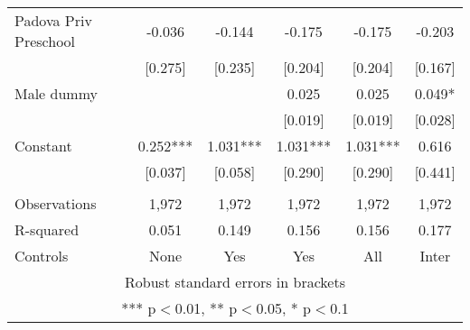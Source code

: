 \begin{tabular}{lccccc}
Padova Priv Preschool & -0.036 & -0.144 & -0.175 & -0.175 & -0.203 \\
 & [0.275] & [0.235] & [0.204] & [0.204] & [0.167] \\
Male dummy &  &  & 0.025 & 0.025 & 0.049* \\
 &  &  & [0.019] & [0.019] & [0.028] \\
Constant & 0.252*** & 1.031*** & 1.031*** & 1.031*** & 0.616 \\
 & [0.037] & [0.058] & [0.290] & [0.290] & [0.441] \\
 &  &  &  &  &  \\
Observations & 1,972 & 1,972 & 1,972 & 1,972 & 1,972 \\
R-squared & 0.051 & 0.149 & 0.156 & 0.156 & 0.177 \\
 Controls & None & Yes & Yes & All & Inter \\ \hline
\multicolumn{6}{c}{ Robust standard errors in brackets} \\
\multicolumn{6}{c}{ *** p$<$0.01, ** p$<$0.05, * p$<$0.1} \\
\end{tabular}
